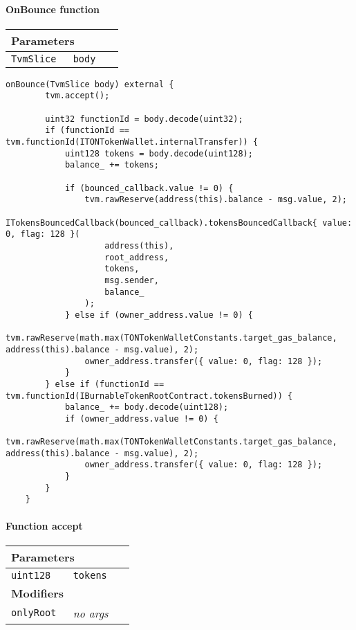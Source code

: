 \paragraph{OnBounce function}


\ifsoltables
\noindent\begin{tabular}{|l|l|p{5cm}|}\hline
\multicolumn{3}{|l|}{\bf Parameters}\\\hline
\tt TvmSlice & \tt body &\\\hline
\end{tabular}
\fi

\vspace{2cm}

\begin{lstlisting}[firstnumber=653]
    onBounce(TvmSlice body) external {
        tvm.accept();

        uint32 functionId = body.decode(uint32);
        if (functionId == tvm.functionId(ITONTokenWallet.internalTransfer)) {
            uint128 tokens = body.decode(uint128);
            balance_ += tokens;

            if (bounced_callback.value != 0) {
                tvm.rawReserve(address(this).balance - msg.value, 2);
                ITokensBouncedCallback(bounced_callback).tokensBouncedCallback{ value: 0, flag: 128 }(
                    address(this),
                    root_address,
                    tokens,
                    msg.sender,
                    balance_
                );
            } else if (owner_address.value != 0) {
                tvm.rawReserve(math.max(TONTokenWalletConstants.target_gas_balance, address(this).balance - msg.value), 2);
                owner_address.transfer({ value: 0, flag: 128 });
            }
        } else if (functionId == tvm.functionId(IBurnableTokenRootContract.tokensBurned)) {
            balance_ += body.decode(uint128);
            if (owner_address.value != 0) {
                tvm.rawReserve(math.max(TONTokenWalletConstants.target_gas_balance, address(this).balance - msg.value), 2);
                owner_address.transfer({ value: 0, flag: 128 });
            }
        }
    }
\end{lstlisting}

\paragraph{Function accept}


\ifsoltables
\noindent\begin{tabular}{|l|l|p{5cm}|}\hline
\multicolumn{3}{|l|}{\bf Parameters}\\\hline
\tt uint128 & \tt tokens &\\\hline
\multicolumn{3}{|l|}{\bf Modifiers}\\\hline
\tt onlyRoot & {\em no args} &\\\hline
\end{tabular}
\fi

